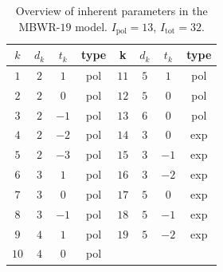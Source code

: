\documentclass[internal,english]{sintefmemo2012}
\numberwithin{equation}{section}
\begin{document}
\begin{table}
  \label{BenderTerms}
  \centering
  \begin{tabular}{c c c c | c c c c }
    $k$		& $d_k$		& $t_k$		& type		 & k		& $d_k$		& $t_k$		& type		   \\
    \hline
    $1$		& $2$       	&$ 1$		& pol              & $11$		& $5$       	&$ 1$		&pol                 \\
    $2$		& $2$       	&$ 0$		&pol               & $12$		& $5$       	&$ 0$		&pol                  \\
    $3$		& $2$       	&$-1$		&pol               & $13$		& $6$       	&$ 0$		&pol                  \\
    $4$		& $2$       	&$-2$ 		&pol               & $14$		& $3$       	&$ 0$		& exp              \\
    $5$		& $2$       	&$-3$ 		&pol               & $15$		& $3$       	&$-1$		& exp              \\
    $6$		& $3$       	&$ 1$		&pol               & $16$		& $3$       	&$-2$		& exp              \\
    $7$		& $3$       	&$ 0$		&pol               & $17$		& $5$       	&$ 0$		& exp              \\
    $8$		& $3$       	&$-1$		&pol               & $18$		& $5$       	&$-1$		& exp              \\
    $9$		& $4$       	&$ 1$		&pol               & $19$		& $5$       	&$-2$		& exp              \\  
    $10$	& $4$       	&$ 0$		&pol               &               &               &               &
  \end{tabular}
  \caption{Overview of inherent parameters in the MBWR-$19$ model. $I_{\mathrm{pol}}=13$, $I_{\mathrm{tot}}=32$.}
\end{table}
\end{document}
